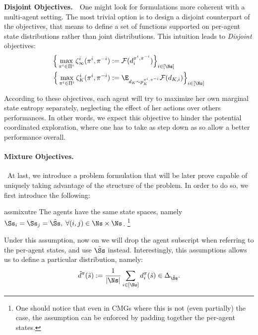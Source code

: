 \textbf{Disjoint Objectives.}~~One might look for formulations more coherent with a multi-agent setting. The most trivial option is to design a disjoint counterpart of the objectives, that means to define a set of functions supported on per-agent state distributions rather than joint distributions. This intuition leads to \emph{Disjoint} objectives: 
\vspace{-2pt}
\begin{align}
         \Big\{ \max_{\pi^i\in \Pi^i} \zeta^i_\infty(\pi^i, \pi^{-i}) &:= \mathcal F(d_i^{\pi^i, \pi^{-i}})\Big\}_{ i \in [\Ns] } \label{eq:mse_decentralized}\\ 
        \Big\{ \max_{\pi^i\in \Pi^i} \zeta^i_K(\pi^i, \pi^{-i}) &:= \E_{d_K\sim p^{\pi^i,\pi^{-i}}_K}\mathcal F (d_{K,i}) \Big\}_{ i \in [\Ns] } \label{eq:mse_finite_decentralized}
\end{align}
\vspace{-10pt}

According to these objectives, each agent will try to maximize her own marginal state entropy separately, neglecting the effect of her actions over others performances. In other words, we expect this objective to hinder the potential coordinated exploration, where one has to take as step down as so allow a better performance overall.
\vspace{-6pt}
\paragraph*{Mixture Objectives.}~At last, we introduce a problem formulation that will be later prove capable of uniquely taking advantage of the structure of the problem. In order to do so, we first introduce the following:

\begin{restatable}[Uniformity]{ass}{mixutre}
    \label{ass:mixture} The agents have the same state spaces, namely $\Ss_i = \Ss_j = \tilde \Ss, \;\forall (i,j) \in \Ns \times \Ns$. \footnote{One should notice that even in CMGs where this is not (even partially) the case, the assumption can be enforced by padding together the per-agent states.}
\end{restatable}
\vspace{-4pt}
Under this assumption, now on we will drop the agent subscript when referring to the per-agent states, and use $\tilde \Ss$ instead. Interestingly, this assumptions allows us to define a particular distribution, namely:
\vspace{-3pt}
\begin{equation*}
    \tilde d^\pi(\tilde s) := \frac{1}{|\Ns|}\sum_{i \in [\Ns]} d^\pi_i(\tilde s) \in \Delta_{\tilde \Ss}.
\end{equation*}
\vspace{-9pt}

